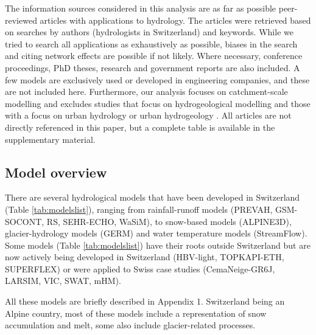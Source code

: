 \documentclass[10pt,a4paper]{article}
\begin{document}
The information sources considered in this analysis are as far as
possible peer-reviewed articles with applications to hydrology. The
articles were retrieved based on searches by authors (hydrologists in
Switzerland) and keywords. While we tried to search all applications as
exhaustively as possible, biases in the search and citing network
effects are possible if not likely. Where necessary, conference
proceedings, PhD theses, research and government reports are also
included. A few models are exclusively used or developed in engineering
companies, and these are not included here. Furthermore, our analysis
focuses on catchment-scale modelling and excludes studies that focus on
hydrogeological modelling \citep{Carlier2019} and those with a focus on
urban hydrology \citep{Peleg2017} or urban
hydrogeology \citep{schirmer2013}. All articles are not directly
referenced in this paper, but a complete table is available in the
supplementary material.

\subsection{Model overview}
\label{sec:models:overview}

There are several hydrological models that have been developed in
Switzerland (Table \ref{tab:modelslist}), ranging from
rainfall-runoff models (PREVAH, GSM-SOCONT, RS, SEHR-ECHO, WaSiM),
to snow-based models (ALPINE3D), glacier-hydrology models (GERM) and
water temperature models (StreamFlow). Some models
(Table \ref{tab:modelslist}) have their roots outside
Switzerland but are now actively being developed in Switzerland
(HBV-light, TOPKAPI-ETH, SUPERFLEX) or were applied to Swiss case
studies (CemaNeige-GR6J, LARSIM, VIC, SWAT, mHM). 

All these models are briefly described in Appendix 1. Switzerland being
an Alpine country, most of these models include a representation of snow
accumulation and melt, some also include glacier-related processes.
\end{document}
